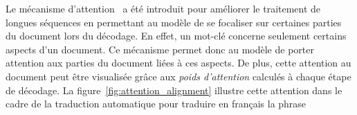 Le mécanisme d'attention~\cite{bahdanau_neural_2014,luong_effective_2015} a été introduit pour améliorer le traitement de longues séquences en permettant au modèle de se focaliser sur certaines parties du document lors du décodage.
%
En effet, un mot-clé concerne seulement certains aspects d'un document. Ce mécanisme permet donc au modèle de porter attention aux parties du document liées à ces aspects.
%
De plus, cette attention au document peut être visualisée grâce aux \emph{poids d'attention} calculés à chaque étape de décodage.
La figure~\ref{fig:attention_alignment} illustre cette attention dans le cadre de la traduction automatique pour traduire en français la phrase 

